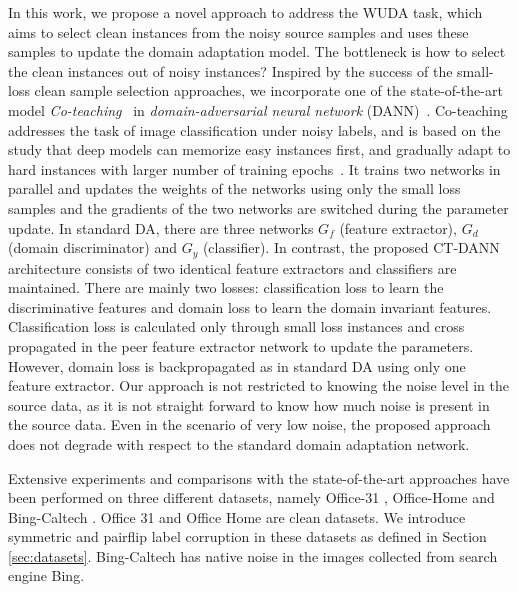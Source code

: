 In this work, we propose a novel approach to address the WUDA task, which aims to select clean instances from the noisy source samples and uses these samples to update the domain adaptation model. 
The bottleneck is how to select the clean instances out of noisy instances?
Inspired by the success of the small-loss clean sample selection approaches, we incorporate one of the state-of-the-art model \textit{Co-teaching}~\cite{coteaching} in \textit{domain-adversarial neural network} (DANN)~\cite{dann}. 
Co-teaching addresses the task of image classification under noisy labels, and is based on the study that deep models can memorize easy instances first, and gradually adapt to hard instances with larger number of training epochs~\cite{memorization}. 
It trains two networks in parallel and updates the weights of the networks using only the small loss samples and the gradients of the two networks are switched during the parameter update. 
In standard DA, there are three networks $G_f$ (feature extractor), $G_d$ (domain discriminator) and $G_y$ (classifier).
In contrast, the proposed CT-DANN architecture consists of two identical feature extractors and classifiers are maintained.
There are mainly two losses: classification loss to learn the discriminative features and domain loss to learn the domain invariant features. 
Classification loss is calculated only through small loss instances and cross propagated in the peer feature extractor network to update the parameters. 
However, domain loss is backpropagated as in standard DA using only one feature extractor. 
Our approach is not restricted to knowing the noise level in the source data, as it is not straight forward to know how much noise is present in the source data. Even in the scenario of very low noise, the proposed approach does not degrade with respect to the standard domain adaptation network.

Extensive experiments and comparisons with the state-of-the-art approaches have been performed on three different datasets, namely Office-31 \cite{office31}, Office-Home \cite{officehome} and Bing-Caltech 
\cite{bing-caltech}. Office 31 and Office Home are clean datasets. We introduce symmetric and pairflip 
label corruption in these datasets as defined in Section \ref{sec:datasets}. Bing-Caltech has native noise in the images collected from search engine Bing. 
